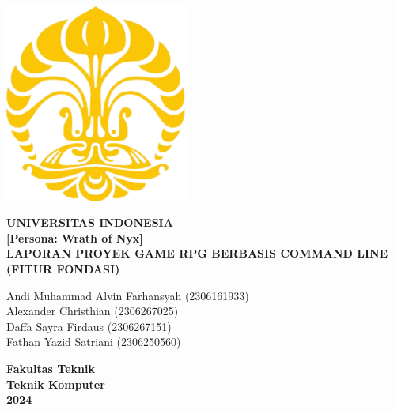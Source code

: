\documentclass[12pt]{article}
\begin{document}
\begin{titlepage}
    \centering
    \includegraphics[width=6cm]{Logo Makara.png} %
    \vspace{1cm}
    
    \centering
    \vspace*{1cm}

    \Huge \textbf{UNIVERSITAS INDONESIA} \\
    \vspace{0.5cm}
    \LARGE \textbf{[Persona: Wrath of Nyx]} \\
    \vspace{1cm}
    \LARGE \textbf{LAPORAN PROYEK GAME RPG BERBASIS COMMAND LINE} \\
    \Large \textbf{(FITUR FONDASI)} \\
    
    \vspace{2cm}

    \Large
    Andi Muhammad Alvin Farhansyah (2306161933) \\
    \vspace{0.5 cm}
    Alexander Christhian (2306267025) \\
    \vspace{0.5 cm}
    Daffa Sayra Firdaus (2306267151) \\
    \vspace{0.5 cm}
    Fathan Yazid Satriani (2306250560) \\
    \vspace{0.5 cm}
    
    \vfill

    \LARGE
    \textbf{Fakultas Teknik} \\
    \textbf{Teknik Komputer} \\
    \textbf{2024} \\
\end{titlepage}
\end{document}
